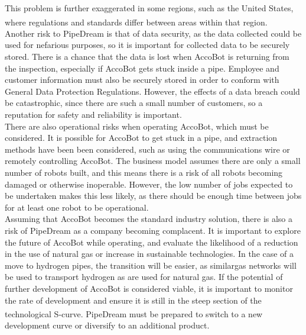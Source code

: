 \documentclass[11pt]{article}		%
\newcommand{\supercite}[1]{\textsuperscript{\cite{#1}}}		%
\begin{document}
	     	This problem is further exaggerated in some regions, such as the United States, where regulations and standards differ between areas within that region\supercite{pless2011making}.
	     \\ 
            \hspace*{2ex}Another risk to PipeDream is that of data security, as the data collected could be used for nefarious purposes, so it is important for collected data to be securely stored.
	     	There is a chance that the data is lost when AccoBot is returning from the inspection, especially if AccoBot gets stuck inside a pipe.
	     	Employee and customer information must also be securely stored in order to conform with General Data Protection Regulations.
	     	However, the effects of a data breach could be catastrophic, since there are such a small number of customers, so a reputation for safety and reliability is important.
	     	\\ 
            \hspace*{2ex}There are also operational risks when operating AccoBot, which must be considered.
	     	It is possible for AccoBot to get stuck in a pipe, and extraction methods have been been considered, such as using the communications wire or remotely controlling AccoBot.
	     	The business model assumes there are only a small number of robots built, and this means there is a risk of all robots becoming damaged or otherwise inoperable.
	     	However, the low number of jobs expected to be undertaken makes this less likely, as there should be enough time between jobs for at least one robot to be operational.
	     	\\ 
            \hspace*{2ex}Assuming that AccoBot becomes the standard industry solution, there is also a risk of PipeDream as a company becoming complacent.
	     	It is important to explore the future of AccoBot while operating, and evaluate the likelihood of a reduction in the use of natural gas or increase in sustainable technologies.
	     	In the case of a move to hydrogen pipes, the transition will be easier, as similargas networks will be used to transport hydrogen as are used for natural gas.
	     	If the potential of further development of AccoBot is considered viable, it is important to monitor the rate of development and ensure it is still in the steep section of the technological S-curve\supercite{christensen1998innovation}.
	     	PipeDream must be prepared to switch to a new development curve or diversify to an additional product.
			    
\end{document}
